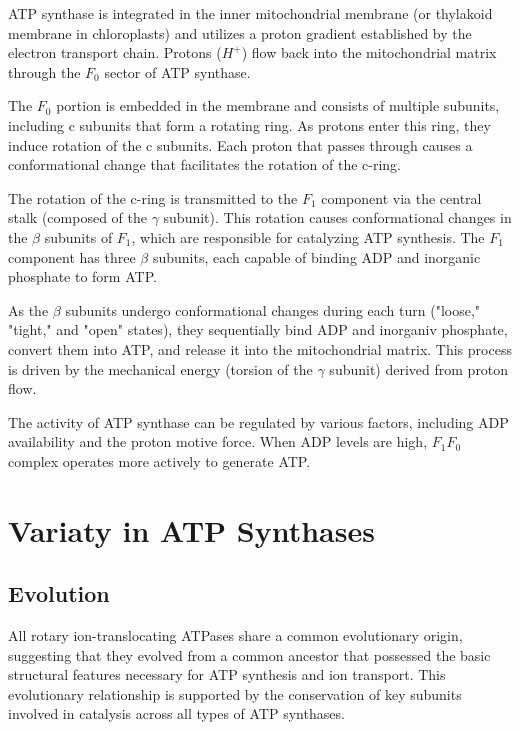 \documentclass{article}
\begin{document}
ATP synthase is integrated in the inner mitochondrial membrane (or thylakoid membrane in chloroplasts) and utilizes a proton gradient established by the electron transport chain. Protons ($H^+$) flow back into the mitochondrial matrix through the \textit{$F_0$} sector of ATP synthase.

The \textit{$F_0$} portion is embedded in the membrane and consists of multiple subunits, including c subunits that form a rotating ring. As protons enter this ring, they induce rotation of the c subunits. Each proton that passes through causes a conformational change that facilitates the rotation of the c-ring.

The rotation of the c-ring is transmitted to the \textit{$F_1$} component via the central stalk (composed of the $\gamma$ subunit). This rotation causes conformational changes in the $\beta$ subunits of \textit{$F_1$}, which are responsible for catalyzing ATP synthesis. The \textit{$F_1$} component has three $\beta$ subunits, each capable of binding ADP and inorganic phosphate to form ATP.

As the $\beta$ subunits undergo conformational changes during each turn ("loose," "tight," and "open" states), they sequentially bind ADP and inorganiv phosphate, convert them into ATP, and release it into the mitochondrial matrix. This process is driven by the mechanical energy (torsion of the $\gamma$ subunit) derived from proton flow.

The activity of ATP synthase can be regulated by various factors, including ADP availability and the proton motive force. When ADP levels are high, \textit{$F_1F_0$}  complex operates more actively to generate ATP.

\section{Variaty in ATP Synthases}

\subsection{Evolution}

All rotary ion-translocating ATPases share a common evolutionary origin, suggesting that they evolved from a common ancestor that possessed the basic structural features necessary for ATP synthesis and ion transport. This evolutionary relationship is supported by the conservation of key subunits involved in catalysis across all types of ATP synthases.
\end{document}
